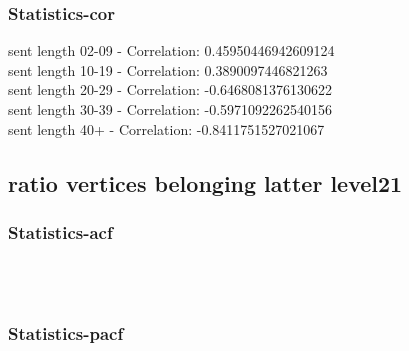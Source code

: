 \documentclass{article}%
\begin{document}
%
\newpage%
\subsubsection{Statistics{-}cor}%
\label{ssubsec:Statistics{-}cor}%
\noindent%
sent length 02-09 - Correlation: 0.45950446942609124\\%
sent length 10-19 - Correlation: 0.3890097446821263\\%
sent length 20-29 - Correlation: -0.6468081376130622\\%
sent length 30-39 - Correlation: -0.5971092262540156\\%
sent length 40+ - Correlation: -0.8411751527021067\\

%
\newpage

%
\subsection{ratio vertices belonging latter level21}%
\label{subsec:ratioverticesbelonginglatterlevel21}%
\subsubsection{Statistics{-}acf}%
\label{ssubsec:Statistics{-}acf}%


\begin{figure}[ht]%
\centering%
\setlength{\abovecaptionskip}{-35pt}%
%
%
\\%
%
%
\\%
%
\end{figure}

%
\newpage%
\subsubsection{Statistics{-}pacf}%
\label{ssubsec:Statistics{-}pacf}%
\end{document}
